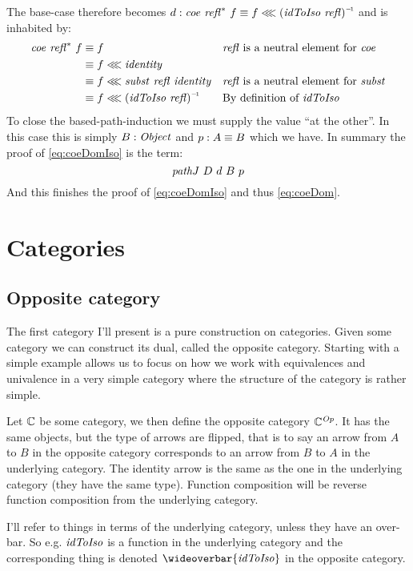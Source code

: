 The base-case therefore becomes
$d \tp \var{coe}\ \refl^*\ f \equiv f \lll \inv{(\idToIso\ \refl)}$
and is inhabited by:
\begin{align*}
\var{coe}\ \refl^*\ f
& \equiv f
  && \text{$\refl$ is a neutral element for $\var{coe}$}\\
& \equiv f \lll \identity \\
& \equiv f \lll \var{subst}\ \refl\ \identity
  && \text{$\refl$ is a neutral element for $\var{subst}$}\\
& \equiv f \lll \inv{(\idToIso\ \refl)}
  && \text{By definition of $\idToIso$}\\
\end{align*}
%
To close the based-path-induction we must supply the value ``at the other''. In
this case this is simply $B \tp \Object$ and $p \mathrel{:} A \equiv B$ which we have.
In summary the proof of \ref{eq:coeDomIso} is the term:
%
\begin{equation}
\label{eq:pathJ-example}
\pathJ\ D\ d\ B\ p
\end{equation}
%
And this finishes the proof of \ref{eq:coeDomIso} and thus \ref{eq:coeDom}.
%
\section{Categories}
\subsection{Opposite category}
\label{op-cat}
The first category I'll present is a pure construction on categories. Given some
category we can construct its dual, called the opposite category. Starting with
a simple example allows us to focus on how we work with equivalences and
univalence in a very simple category where the structure of the category is
rather simple.

Let $\mathbb{C}$ be some category, we then define the opposite category
$\mathbb{C}^{\mathit{Op}}$. It has the same objects, but the type of arrows are flipped,
that is to say an arrow from $A$ to $B$ in the opposite category corresponds to
an arrow from $B$ to $A$ in the underlying category. The identity arrow is the
same as the one in the underlying category (they have the same type). Function
composition will be reverse function composition from the underlying category.

I'll refer to things in terms of the underlying category, unless they have an
over-bar. So e.g. $\idToIso$ is a function in the underlying category and the
corresponding thing is denoted $\wideoverbar{\idToIso}$ in the opposite
category.


